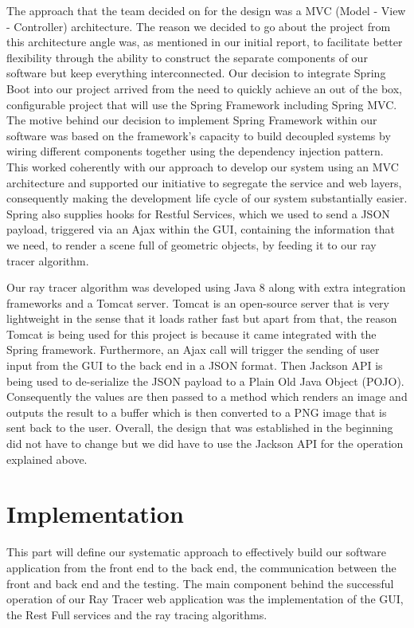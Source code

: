 \documentclass[11pt,a4paper]{article}
\begin{document}
The approach that the team decided on for the design was a MVC (Model - View - Controller) architecture. The reason we decided to go about the project from this architecture angle was, as mentioned in our initial report, to facilitate better flexibility through the ability to construct the separate components of our software but keep everything interconnected. Our decision to integrate Spring Boot into our project arrived from the need to quickly achieve an out of the box, configurable project that will use the Spring Framework including Spring MVC. The motive behind our decision to implement Spring Framework within our software was based on the framework’s capacity to build decoupled systems by wiring different components together using the dependency injection pattern. This worked coherently with our approach to develop our system using an MVC architecture and supported our initiative to segregate the service and web layers, consequently making the development life cycle of our system substantially easier. Spring also supplies hooks for Restful Services, which we used to send a JSON payload, triggered via an Ajax within the GUI, containing the information that we need, to render a scene full of geometric objects, by feeding it to our ray tracer algorithm. 

Our ray tracer algorithm was developed using Java 8 along with extra integration frameworks and a Tomcat server. Tomcat is an open-source server that is very lightweight in the sense that it loads rather fast but apart from that, the reason Tomcat is being used for this project is because it came integrated with the Spring framework. Furthermore, an Ajax call will trigger the sending of user input from the GUI to the back end in a JSON format. Then Jackson API is being used to de-serialize the JSON payload to a Plain Old Java Object (POJO). Consequently the values are then passed to a method which renders an image and outputs the result to a buffer which is then converted to a PNG image that is sent back to the user. Overall, the design that was established in the beginning did not have to change but we did have to use the Jackson API for the operation explained above. 

\section{Implementation}
This part will define our systematic approach to effectively build our software application from the front end to the back end, the communication between the front and back end and the testing. The main component behind the successful operation of our Ray Tracer web application was the implementation of the GUI, the Rest Full services and the ray tracing algorithms. 
\end{document}
